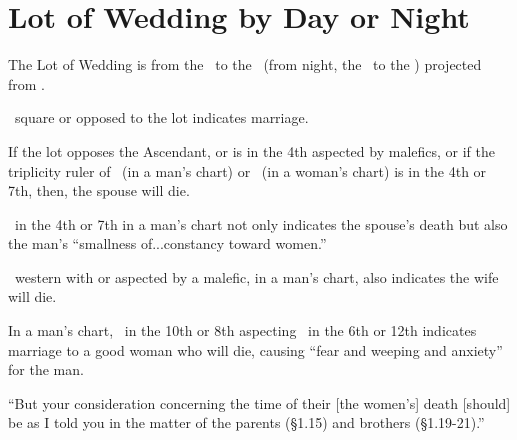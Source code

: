 \section{Lot of Wedding by Day or Night}

The Lot of Wedding is from the \Sun\, to the \Moon\, (from night, the \Moon\, to the \Sun) projected from \Venus.

\Jupiter\, square or opposed to the lot indicates marriage.

If the lot opposes the Ascendant, or is in the 4th aspected by malefics, or if the triplicity ruler of \Venus\, (in a man's chart) or \Mars\, (in a woman's chart) is in the 4th or 7th, then, the spouse will die.

\Venus\, in the 4th or 7th in a man's chart not only indicates the spouse's death but also the man's ``smallness of...constancy toward women.''

\Venus\, western with or aspected by a malefic, in a man's chart, also indicates the wife will die.

In a man's chart, \Jupiter\, in the 10th or 8th aspecting \Venus\, in the 6th or 12th indicates marriage to a good woman who will die, causing ``fear and weeping and anxiety'' for the man.

``But your consideration concerning the time of their [the women's] death [should] be as I told you in the matter of the parents (\S1.15) and brothers (\S1.19-21).''